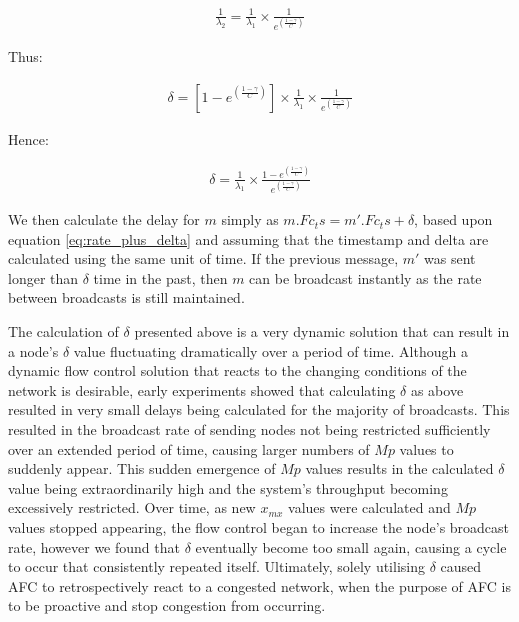     \begin{equation}
		     \begin{aligned}
		         \frac{1}{\lambda_2} = \frac{1}{\lambda_1} \times \frac{1}{e ^{ ({\frac{1-\gamma}{C}})}}
		     \end{aligned}
    \end{equation}
    
    Thus:
    
     \begin{equation}
		     \begin{aligned}
		         \delta = [1 - e ^{ ({\frac{1-\gamma}{C}})}] \times \frac{1}{\lambda_1} \times \frac{1}{e ^{ ({\frac{1-\gamma}{C}})}}
		     \end{aligned}
    \end{equation}
    
    Hence:
    
        \begin{equation}
		     \begin{aligned}
		         \delta = \frac{1}{\lambda_1}  \times   \frac{1 - e ^{ ({\frac{1-\gamma}{C}})}}{e ^{ ({\frac{1-\gamma}{C}})}}
		     \end{aligned}
    \end{equation}
    
    We then calculate the delay for $m$ simply as $m.Fc_ts = m'.Fc_ts + \delta$, based upon equation \ref{eq:rate_plus_delta} and assuming that the timestamp and delta are calculated using the same unit of time.  If the previous message, $m'$ was sent longer than $\delta$ time in the past, then $m$ can be broadcast instantly as the rate between broadcasts is still maintained.  
    
    The calculation of $\delta$ presented above is a very dynamic solution that can result in a node's $\delta$ value fluctuating dramatically over a period of time.  Although a dynamic flow control solution that reacts to the changing conditions of the network is desirable, early experiments showed that calculating $\delta$ as above resulted in very small delays being calculated for the majority of broadcasts.  This resulted in the broadcast rate of sending nodes not being restricted sufficiently over an extended period of time, causing larger numbers of $Mp$ values to suddenly appear. This sudden emergence of $Mp$ values results in the calculated $\delta$ value being extraordinarily high and the system's throughput becoming excessively restricted.  Over time, as new $x_{mx}$ values were calculated and $Mp$ values stopped appearing, the flow control began to increase the node's broadcast rate, however we found that $\delta$ eventually become too small again, causing a cycle to occur that consistently repeated itself.  Ultimately, solely utilising $\delta$ caused AFC to retrospectively react to a congested network, when the purpose of AFC is to be proactive and stop congestion from occurring.  
    
